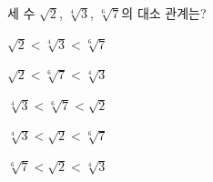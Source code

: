 세 수 $\sqrt{2}$, $\sqrt[4]{3}$, $\sqrt[6]{7}$의 대소 관계는?
\begin{choicesii}{\rule[-3ex]{0pt}{8ex}$\sqrt{2}<\sqrt[4]{3}<\sqrt[6]{7}$}{\rule[-3ex]{0pt}{8ex}$\sqrt{2}<\sqrt[6]{7}<\sqrt[4]{3}$}{\rule[-3ex]{0pt}{8ex}$\sqrt[4]{3}<\sqrt[6]{7}<\sqrt{2}$}{\rule[-3ex]{0pt}{8ex}$\sqrt[4]{3}<\sqrt{2}<\sqrt[6]{7}$}{\rule[-3ex]{0pt}{8ex}$\sqrt[6]{7}<\sqrt{2}<\sqrt[4]{3}$}\end{choicesii}
